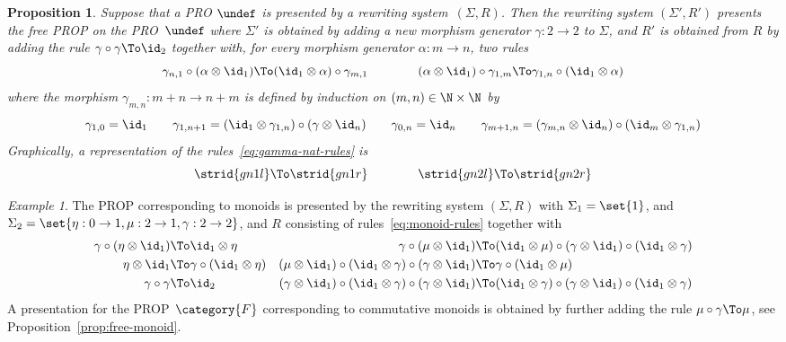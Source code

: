 \documentclass[submission,copyright,creativecommons]{eptcs}
\let\C\undef
\newtheorem{proposition}[theorem]{Proposition}
\theoremstyle{definition}
\theoremstyle{remark}
\newtheorem{example}[theorem]{Example}
\begin{document}
\begin{proposition}
  Suppose that a PRO $\C$ is presented by a rewriting system~$(\Sigma,R)$. Then
  the rewriting system $(\Sigma',R')$ presents the free PROP on the PRO~$\C$
  where $\Sigma'$ is obtained by adding a new morphism generator $\gamma:2\to 2$
  to $\Sigma$, and $R'$ is obtained from $R$ by adding the rule
  $\gamma\circ\gamma\To\id_2$ together with, for every morphism generator
  $\alpha:m\to n$, two rules
  \begin{equation}
    \label{eq:gamma-nat-rules}
    \gamma_{n,1}\circ(\alpha\otimes\id_1)\To(\id_1\otimes\alpha)\circ\gamma_{m,1}
    \qquad\qquad
    (\alpha\otimes\id_1)\circ\gamma_{1,m}\To\gamma_{1,n}\circ(\id_1\otimes\alpha)
  \end{equation}
  where the morphism $\gamma_{m,n}:m+n\to n+m$ is defined by induction on
  $(m,n)\in\N\times\N$ by
  \[
  \gamma_{1,0}=\id_1
  \qquad
  \gamma_{1,n+1}=(\id_1\otimes\gamma_{1,n})\circ(\gamma\otimes\id_n)
  \qquad
  \gamma_{0,n}=\id_n
  \qquad
  \gamma_{m+1,n}=(\gamma_{m,n}\otimes\id_n)\circ(\id_m\otimes\gamma_{1,n})
  \]
  Graphically, a representation of the rules~\eqref{eq:gamma-nat-rules} is
  \[
  \strid{gn1l}\To\strid{gn1r}
  \qquad\qquad
  \strid{gn2l}\To\strid{gn2r}
  \]
\end{proposition}

\begin{example}
  The PROP corresponding to monoids is presented by the rewriting system
  $(\Sigma,R)$ with $\Sigma_1=\set{1}$, and $\Sigma_2=\set{\eta:0\to 1,\mu:2\to
    1,\gamma:2\to 2}$, and $R$ consisting of rules~\eqref{eq:monoid-rules}
  together with
  \begin{align*}
    \gamma\circ(\eta\otimes\id_1)&\To\id_1\otimes\eta
    &
    \gamma\circ(\mu\otimes\id_1)&\To(\id_1\otimes\mu)\circ(\gamma\otimes\id_1)\circ(\id_1\otimes\gamma)
    \\
    \eta\otimes\id_1&\To\gamma\circ(\id_1\otimes\eta)
    &
    (\mu\otimes\id_1)\circ(\id_1\otimes\gamma)\circ(\gamma\otimes\id_1)&\To\gamma\circ(\id_1\otimes\mu)
    \\
    \gamma\circ\gamma&\To\id_2
    &
    (\gamma\otimes\id_1)\circ(\id_1\otimes\gamma)\circ(\gamma\otimes\id_1)&\To(\id_1\otimes\gamma)\circ(\gamma\otimes\id_1)\circ(\id_1\otimes\gamma)
  \end{align*}
  A presentation for the PROP~$\category{F}$ corresponding to commutative
  monoids is obtained by further adding the rule $\mu\circ\gamma\To\mu$, see
  Proposition~\ref{prop:free-monoid}.
\end{example}
\end{document}
